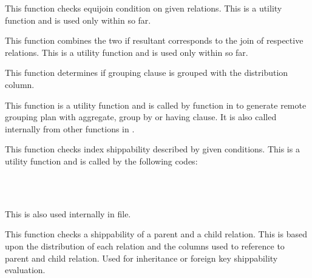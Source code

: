   
      This function checks equijoin condition on given relations.
      This is a utility function and is used only within  so far.
  
  
      This function combines the two  if resultant  corresponds to
      the join of respective relations.
      This is a utility function and is used only within  so far.
  
  
      This function determines if grouping clause is grouped with
      the distribution column.
      
      This function is a utility function and is called by
       function in 
      to generate remote grouping plan with aggregate, group by or
      having clause.
      It is also called internally from other functions in .
  
  
      This function checks index shippability described by given conditions.
      This is a utility function and is called by the following codes:
  
      \FuncRefHdr
		  \\ \vspace{3pt}
		  \\ \hline
      \FuncRefTrailor
      
      This is also used internally in  file.
  
  
      This function checks a shippability of a parent and a child relation.
      This is based upon the distribution of each relation and the columns used to
      reference to parent and child relation.
      Used for inheritance or foreign key shippability evaluation.
      
